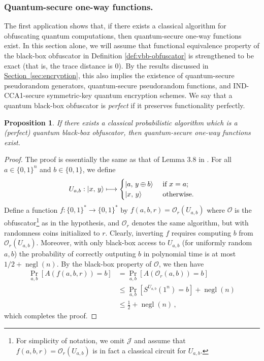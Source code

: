 \documentclass[envcountsame]{llncs}
\numberwithin{equation}{section}
\newtheorem{prop}{Proposition}
\newcommand{\opn}{\operatorname}
\newcommand{\expref}[2]{\texorpdfstring{\hyperref[#2]{#1~\ref{#2}}}{#1~\ref{#2}}}
\newcommand{\algo}{\mathcal}
\newcommand{\negl}{\opn{negl}}
\newcommand{\prob}{\opn{Pr}}
\begin{document}
\subsubsection{Quantum-secure one-way functions.}

The first application shows that, if there exists a classical algorithm for obfuscating quantum computations, then quantum-secure one-way functions exist. In this section alone, we will assume that functional equivalence property of the black-box obfuscator in Definition \ref{def:vbb-obfuscator} is strengthened to be exact (that is, the trace distance is $0$).  By the results discussed in \expref{Section}{sec:encryption}, this also implies the existence of quantum-secure pseudorandom generators, quantum-secure pseudorandom functions, and IND-CCA1-secure symmetric-key quantum encryption schemes. We say that a quantum black-box obfuscator is \emph{perfect} if it preserves functionality perfectly.

\begin{prop}
If there exists a classical probabilistic algorithm which is a (perfect) quantum black-box obfuscator, then quantum-secure one-way functions exist.
\end{prop}
\begin{proof}
The proof is essentially the same as that of Lemma 3.8 in \cite{BGIRSVY12}. For all $a \in \{0, 1\}^n$ and $b \in \{0, 1\}$, we define 
$$
U_{a, b} : {\left\vert{x,\, y}\right\rangle} \longmapsto
\begin{cases}
{\left\vert{a,\, y \oplus b}\right\rangle} &\text{ if } x = a;\\
{\left\vert{x,\, y}\right\rangle} &\text{ otherwise}.
\end{cases}
$$
Define a function $f : \{0, 1\}^* \rightarrow \{0, 1\}^*$ by $f(a, b, r) = \algo O_r(U_{a, b})$ where $\algo O$ is the obfuscator\footnote{For simplicity of notation, we omit $\algo J$ and assume that $f(a, b, r) = \algo O_r(U_{a, b})$ is in fact a classical circuit for $U_{a, b}$.} as in the hypothesis, and $\algo O_r$ denotes the same algorithm, but with randomness coins initialized to $r$. Clearly, inverting $f$ requires computing $b$ from $\algo O_r(U_{a, b})$. Moreover, with only black-box access to $U_{a, b}$ (for uniformly random $a, b$) the probability of correctly outputing $b$ in polynomial time is at most $1/2 + \negl(n)$.  By the black-box property of $\mathcal O$, we then have
\begin{align*}
\prob_{a, b} [ A(f(a, b, r)) = b] 
&= \prob_{a, b} [ A(\mathcal O_r(a, b)) = b ]\\
&\leq \prob_{a, b} \left[ S^{U_{a, b}}(1^n) = b\right] + \negl(n)\\
&\leq \frac{1}{2} + \negl(n)\,,
\end{align*}
which completes the proof.
\end{proof}
\end{document}
